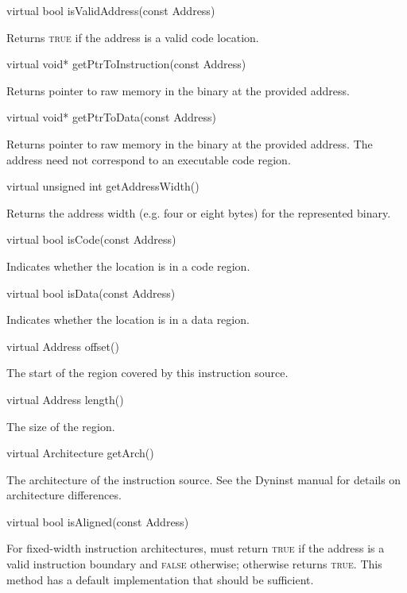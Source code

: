 \documentclass{article}
\newenvironment{apient}{\small\verbatim}{\endverbatim}
\newcommand{\apidesc}[1]{%
{\addtolength{\leftskip}{4em}%
#1\par\medskip}
}
\begin{document}
\begin{apient}
virtual bool isValidAddress(const Address) 
\end{apient}
\apidesc{Returns {\scshape true} if the address is a valid code location.}

\begin{apient}
virtual void* getPtrToInstruction(const Address)
\end{apient}
\apidesc{Returns pointer to raw memory in the binary at the provided address.}

\begin{apient}
virtual void* getPtrToData(const Address)
\end{apient}
\apidesc{Returns pointer to raw memory in the binary at the provided address. The address need not correspond to an executable code region.}

\begin{apient}
virtual unsigned int getAddressWidth()
\end{apient}
\apidesc{Returns the address width (e.g. four or eight bytes) for the represented binary.}

\begin{apient}
virtual bool isCode(const Address)
\end{apient}
\apidesc{Indicates whether the location is in a code region.}

\begin{apient}
virtual bool isData(const Address)
\end{apient}
\apidesc{Indicates whether the location is in a data region.}

\begin{apient}
virtual Address offset()
\end{apient}
\apidesc{The start of the region covered by this instruction source.}

\begin{apient}
virtual Address length()
\end{apient}
\apidesc{The size of the region.}

\begin{apient}
virtual Architecture getArch()
\end{apient}
\apidesc{The architecture of the instruction source. See the Dyninst manual for details on architecture differences.}

\begin{apient}
virtual bool isAligned(const Address)
\end{apient}
\apidesc{For fixed-width instruction architectures, must return {\scshape true} if the address is a valid instruction boundary and {\scshape false} otherwise; otherwise returns {\scshape true}. This method has a default implementation that should be sufficient.}
\end{document}
